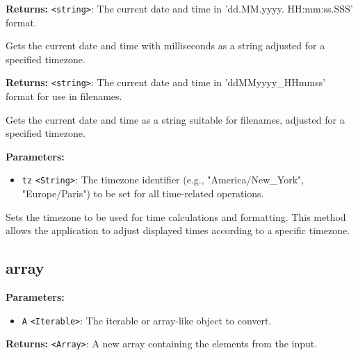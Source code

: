 \documentclass[12pt,a4paper]{article}
\begin{document}
\noindent \textbf{Returns:} \texttt{<string>}: The current date and time in 'dd.MM.yyyy. HH:mm:ss.SSS' format.

\noindent Gets the current date and time with milliseconds as a string adjusted for a specified timezone.

\vspace{5mm}
\noindent {}


\noindent \textbf{Returns:} \texttt{<string>}: The current date and time in 'ddMMyyyy\_HHmmss' format for use in filenames.

\noindent Gets the current date and time as a string suitable for filenames, adjusted for a specified timezone.

\vspace{5mm}
\noindent {}


\noindent \textbf{Parameters:}
\begin{itemize}
  \item \texttt{tz} \texttt{<String>}: The timezone identifier (e.g., "America/New\_York", "Europe/Paris") to be set for all time-related operations.
\end{itemize}

\noindent Sets the timezone to be used for time calculations and formatting. This method allows the application to adjust displayed times according to a specific timezone.


\subsection{array}
\vspace{5mm}
\noindent {}


\noindent \textbf{Parameters:}
\begin{itemize}
  \item \texttt{A} \texttt{<Iterable>}: The iterable or array-like object to convert.
\end{itemize}

\noindent \textbf{Returns:} \texttt{<Array>}: A new array containing the elements from the input.
\end{document}
